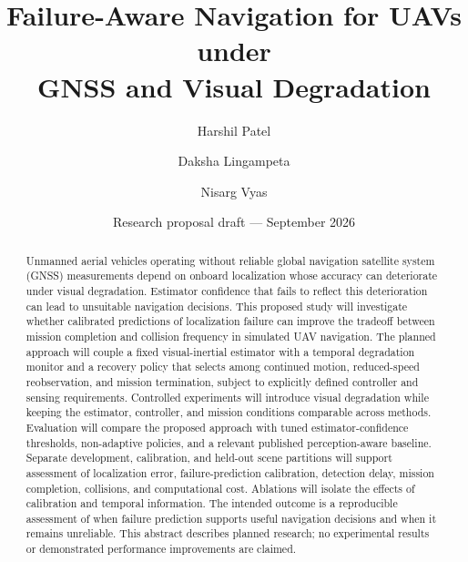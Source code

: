 \documentclass[11pt,a4paper]{article}
\title{Failure-Aware Navigation for UAVs under\protect\\ GNSS and Visual Degradation}
\author{Harshil Patel \and Daksha Lingampeta \and Nisarg Vyas}
\date{Research proposal draft --- September 2026}
\begin{document}
\maketitle
\begin{abstract}
Unmanned aerial vehicles operating without reliable global navigation satellite system (GNSS) measurements depend on onboard localization whose accuracy can deteriorate under visual degradation. Estimator confidence that fails to reflect this deterioration can lead to unsuitable navigation decisions. This proposed study will investigate whether calibrated predictions of localization failure can improve the tradeoff between mission completion and collision frequency in simulated UAV navigation. The planned approach will couple a fixed visual-inertial estimator with a temporal degradation monitor and a recovery policy that selects among continued motion, reduced-speed reobservation, and mission termination, subject to explicitly defined controller and sensing requirements. Controlled experiments will introduce visual degradation while keeping the estimator, controller, and mission conditions comparable across methods. Evaluation will compare the proposed approach with tuned estimator-confidence thresholds, non-adaptive policies, and a relevant published perception-aware baseline. Separate development, calibration, and held-out scene partitions will support assessment of localization error, failure-prediction calibration, detection delay, mission completion, collisions, and computational cost. Ablations will isolate the effects of calibration and temporal information. The intended outcome is a reproducible assessment of when failure prediction supports useful navigation decisions and when it remains unreliable. This abstract describes planned research; no experimental results or demonstrated performance improvements are claimed.
\end{abstract}
\end{document}
